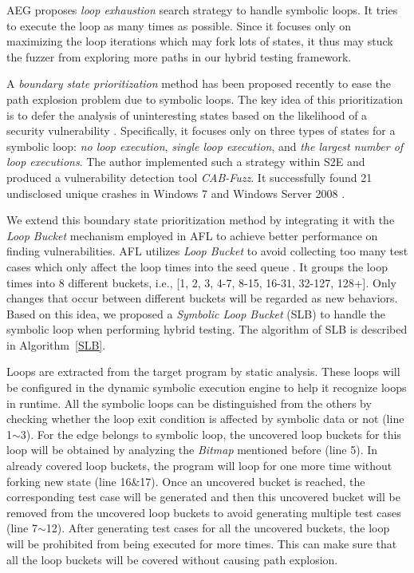 \documentclass{cta-author}
\begin{document}
AEG \cite{Avgerinos:2014:AEG:2556647.2560219} proposes \emph{loop exhaustion}
search strategy to handle symbolic loops. It tries to execute the loop as many
times as possible. Since it focuses only on maximizing the loop iterations which
may fork lots of states, it thus may stuck the fuzzer from exploring more paths 
in our hybrid testing framework.

A \textit{boundary state prioritization} method has been proposed recently
to ease the path explosion problem due to symbolic loops.
The key idea of this prioritization is to defer the analysis of 
uninteresting states based on the likelihood of a security vulnerability \cite{cab-fuzz}. 
Specifically, it focuses only on three types of states for a symbolic 
loop: \textit{no loop execution}, \textit{single loop execution}, and 
\textit{the largest number of loop executions}.
The author implemented such a strategy within S2E \cite{chipounov2011s2e} 
and produced a vulnerability detection tool \textit{CAB-Fuzz}.
It successfully found 21 undisclosed unique crashes in Windows 7 and 
Windows Server 2008 \cite{cab-fuzz}.

We extend this boundary state prioritization method by integrating it 
with the \emph{Loop Bucket} mechanism employed in AFL \cite{online:afl} 
to achieve better performance on finding vulnerabilities.
AFL utilizes \emph{Loop Bucket} to avoid collecting too many test cases 
which only affect the loop times into the seed queue \cite{online:afl}. 
It groups the loop times into 8 different buckets, i.e., 
[1, 2, 3, 4-7, 8-15, 16-31, 32-127, 128+]. Only changes that occur 
between different buckets will be regarded as new behaviors. 
Based on this idea, we proposed a \textit{Symbolic Loop Bucket} (SLB) 
to handle the symbolic loop when performing hybrid testing. The 
algorithm of SLB is described in Algorithm~\ref{SLB}.

Loops are extracted from the target program by static analysis. 
These loops will be configured in the dynamic symbolic execution 
engine to help it recognize loops in runtime. All the symbolic loops 
can be distinguished from the others by checking whether the loop 
exit condition is affected by symbolic data or not (line 1$\sim$3). 
For the edge belongs to symbolic loop, the uncovered loop buckets 
for this loop will be obtained by analyzing the \textit{Bitmap} 
mentioned before (line 5). 
In already covered loop buckets, the program will loop for one more 
time without forking new state (line 16\&17). Once an uncovered bucket 
is reached, the corresponding test case will be generated and then 
this uncovered bucket will be removed from the uncovered loop buckets 
to avoid generating multiple test cases (line 7$\sim$12). After 
generating test cases for all the uncovered buckets, the loop will 
be prohibited from being executed for more times. This can make sure 
that all the loop buckets will be covered without causing path explosion.
\end{document}

